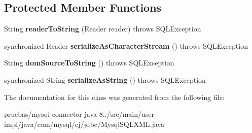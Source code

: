 \subsection*{Protected Member Functions}
\begin{DoxyCompactItemize}
\item 
\mbox{\label{classcom_1_1mysql_1_1cj_1_1jdbc_1_1_mysql_s_q_l_x_m_l_ad11ae3ca836ed96ffae35eff31a9a2a9}} 
String {\bfseries reader\+To\+String} (Reader reader)  throws S\+Q\+L\+Exception 
\item 
\mbox{\label{classcom_1_1mysql_1_1cj_1_1jdbc_1_1_mysql_s_q_l_x_m_l_a8fd29ddd9cbe412e6f466d876eab9495}} 
synchronized Reader {\bfseries serialize\+As\+Character\+Stream} ()  throws S\+Q\+L\+Exception 
\item 
\mbox{\label{classcom_1_1mysql_1_1cj_1_1jdbc_1_1_mysql_s_q_l_x_m_l_a97d6a44faa7825851b8f3555e2b794d6}} 
String {\bfseries dom\+Source\+To\+String} ()  throws S\+Q\+L\+Exception 
\item 
\mbox{\label{classcom_1_1mysql_1_1cj_1_1jdbc_1_1_mysql_s_q_l_x_m_l_a7ffb73b86dd1fb3cc863bdf90abcb170}} 
synchronized String {\bfseries serialize\+As\+String} ()  throws S\+Q\+L\+Exception 
\end{DoxyCompactItemize}


The documentation for this class was generated from the following file\+:\begin{DoxyCompactItemize}
\item 
pruebas/mysql-\/connector-\/java-\/8../src/main/user-\/impl/java/com/mysql/cj/jdbc/Mysql\+S\+Q\+L\+X\+M\+L.\+java\end{DoxyCompactItemize}
